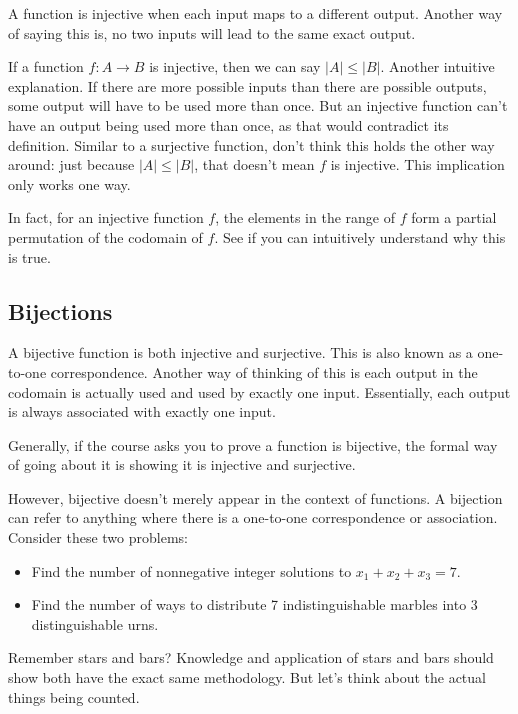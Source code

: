 \documentclass[11pt]{scrartcl}
\begin{document}
\begin{definition}
    A function is injective when each input maps to a different output. Another way of saying this is, no two inputs will lead to the same exact output.
\end{definition}
If a function $f : A \rightarrow B$ is injective, then we can say $|A| \leq |B|$. Another intuitive explanation. If there are more possible inputs than there are possible outputs, some output will have to be used more than once. But an injective function can't have an output being used more than once, as that would contradict its definition. Similar to a surjective function, don't think this holds the other way around: just because $|A| \leq |B|$, that doesn't mean $f$ is injective. This implication only works one way.

In fact, for an injective function $f$, the elements in the range of $f$ form a partial permutation of the codomain of $f$. See if you can intuitively understand why this is true.

\subsection{Bijections}

\begin{definition}
    A bijective function is both injective and surjective. This is also known as a one-to-one correspondence. Another way of thinking of this is each output in the codomain is actually used and used by exactly one input. Essentially, each output is always associated with exactly one input.
\end{definition}

Generally, if the course asks you to prove a function is bijective, the formal way of going about it is showing it is injective and surjective.

However, bijective doesn't merely appear in the context of functions. A bijection can refer to anything where there is a one-to-one correspondence or association. Consider these two problems:
\begin{itemize}
    \item Find the number of nonnegative integer solutions to $x_1 + x_2 + x_3 = 7$.
    \item Find the number of ways to distribute 7 indistinguishable marbles into 3 distinguishable urns.
\end{itemize}
Remember stars and bars? Knowledge and application of stars and bars should show both have the exact same methodology. But let's think about the actual things being counted.
\end{document}
